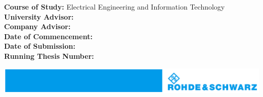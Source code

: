 \begin{titlepage}
    \begin{flushleft}
        \small{
            \textbf{Course of Study:} Electrical Engineering and Information Technology\\
            \vspace{0.2cm}
            \textbf{University Advisor:} \uniAdvisor \\
            \textbf{Company Advisor:} \compAdvisor \\
            \vspace{0.2cm}
            \textbf{Date of Commencement:} \startDate \\
            \textbf{Date of Submission:} \submissionDate \\
            \vspace{0.2cm}
            \textbf{Running Thesis Number:} \thesisNumber \\
        }
    \end{flushleft}
    \vspace{2cm}
    \vfill  %
    \includegraphics[width=\textwidth,height=\textheight,keepaspectratio]{figures/logos/A_blue_strip_RS.pdf}
\end{titlepage}

\cleardoublepage  %